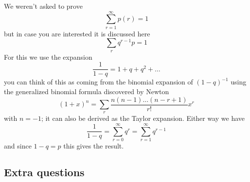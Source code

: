 \documentclass[11pt,a4paper]{scrartcl}
\begin{document}
\begin{enumerate}
We weren't asked to prove
\begin{equation}
\sum_{r=1}^\infty p(r)=1
\end{equation}
but in case you are interested it is discussed here
\begin{equation}
\sum_r q^{r-1}p=1
\end{equation}
For this we use the expansion
\begin{equation}
\frac{1}{1-q}=1+q+q^2+\ldots
\end{equation}
you can think of this as coming from the binomial expansion of $(1-q)^{-1}$ using the generalized binomial formula discovered by Newton
\begin{equation}
(1+x)^n=\sum_r \frac{n(n-1)\ldots (n-r+1)}{r!}x^r
\end{equation}
with $n=-1$; it can also be derived as the Taylor expansion. Either way we have
\begin{equation}
\frac{1}{1-q}=\sum_{r=0}^\infty q^r=\sum_{r=1}^\infty q^{r-1}
\end{equation}
and since $1-q=p$ this gives the result.

\end{enumerate}

\subsection*{Extra questions}
\end{document}
